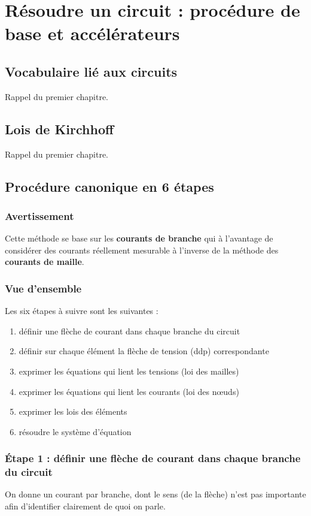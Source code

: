 \documentclass	[11pt, a4paper, openany]{book}
\begin{document}
\chapter{Résoudre un circuit : procédure de base et accélérateurs}
\section{Vocabulaire lié aux circuits}
Rappel du premier chapitre.

\section{Lois de Kirchhoff}
Rappel du premier chapitre.

\section{Procédure canonique en 6 étapes}
\subsection{Avertissement}
Cette méthode se base sur les \textbf{courants de branche} qui à l'avantage de considérer des courants réellement mesurable à l'inverse de la méthode des \textbf{courants de maille}.

\subsection{Vue d'ensemble}
Les six étapes à suivre sont les suivantes :
\begin{enumerate}
\item définir une flèche de courant dans chaque branche du circuit
\item définir sur chaque élément la flèche de tension (ddp) correspondante
\item exprimer les équations qui lient les tensions (loi des mailles)
\item exprimer les équations qui lient les courants (loi des nœuds)
\item exprimer les lois des éléments
\item résoudre le système d'équation
\end{enumerate}
\subsection{Étape 1 : définir une flèche de courant dans chaque branche du circuit}
On donne un courant par branche, dont le sens (de la flèche) n'est pas importante afin d'identifier clairement de quoi on parle.
\end{document}
